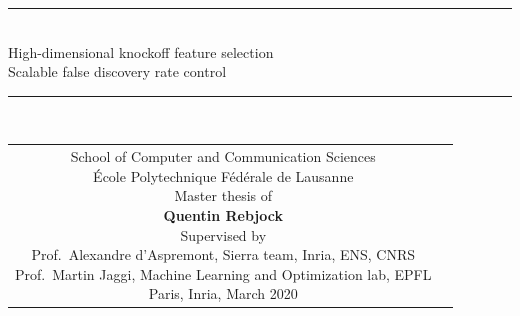 \begin{titlepage}
\begin{center}
\rule{0.85\textwidth}{2pt}\\[8pt]
{\huge High-dimensional knockoff feature selection}\\[6pt]
{\large Scalable false discovery rate control}\\[2pt]
\rule{0.85\textwidth}{1pt}\\
\vspace{5cm}
\begin{tabular} {cc}
\parbox{0.7\textwidth}{%
	School of Computer and Communication Sciences\\
	École Polytechnique Fédérale de Lausanne\\
	Master thesis of\\[4pt]
	\null \hspace{3em} \textbf{Quentin Rebjock}\\[9pt]
%
\small
Supervised by\\[4pt]
%
    Prof.\ Alexandre d'Aspremont, Sierra team, Inria, ENS, CNRS\\
    Prof.\ Martin Jaggi, Machine Learning and Optimization lab, EPFL\\[12pt]
%
Paris, Inria, March 2020}
\end{tabular}

\end{center}
\end{titlepage}

\restoregeometry
